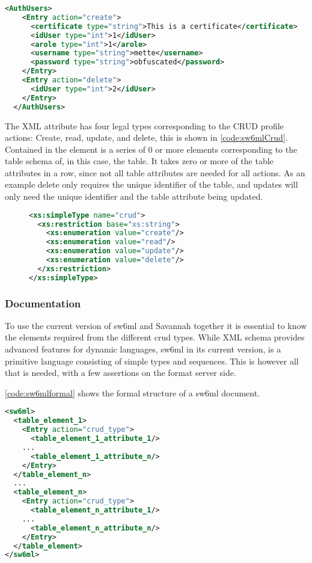 \begin{Code}
\begin{lstlisting}[label=code:sw6mlExample01,language=XML,caption=Example of sw6ml syntax]
 <AuthUsers>
    <Entry action="create">
      <certificate type="string">This is a certificate</certificate>
      <idUser type="int">1</idUser>
      <arole type="int">1</arole>
      <username type="string">mette</username>
      <password type="string">obfuscated</password>
    </Entry>
    <Entry action="delete">
      <idUser type="int">2</idUser>
    </Entry>
  </AuthUsers>
\end{lstlisting}
\end{Code}
The  XML attribute has four legal types corresponding to the CRUD profile actions: Create, read, update, and delete, this is shown in \autoref{code:sw6mlCrud}.
Contained in the   element is a series of 0 or more elements corresponding to the table schema of, in this case, the  table.
It takes zero or more of the table attributes in a row, since not all table attributes are needed for all actions. As an example delete only requires the unique identifier of the table, and
updates will only need the unique identifier and the table attribute being updated.
\begin{figure}[H]
\begin{lstlisting}[label=code:sw6mlCrud,language=XML,caption=sw6ml crud simple type]
 <xs:simpleType name="crud">
  <xs:restriction base="xs:string">
    <xs:enumeration value="create"/>
    <xs:enumeration value="read"/>
    <xs:enumeration value="update"/>
    <xs:enumeration value="delete"/>
  </xs:restriction>
</xs:simpleType>
\end{lstlisting}
\end{figure}

\subsubsection{Documentation}
\label{sw6mlusage}
To use the current version of sw6ml and Savannah together it is essential to know the elements required from the different crud types.
While XML schema provides advanced features for dynamic languages, sw6ml in its current version, is a primitive language consisting of simple types and sequences.
This is however all that is needed, with a few assertions on the format server side.

\autoref{code:sw6mlformal} shows the formal structure of a sw6ml document.
\begin{Code}
\begin{lstlisting}[label=code:sw6mlformal,language=XML,caption=Root and table elements]
<sw6ml> 
  <table_element_1>
    <Entry action="crud_type">
      <table_element_1_attribute_1/>
	...
      <table_element_1_attribute_n/>
    </Entry>
  </table_element_n>
  ...
  <table_element_n>
    <Entry action="crud_type">
      <table_element_n_attribute_1/>
	...
      <table_element_n_attribute_n/>
    </Entry>
  </table_element>
</sw6ml>
\end{lstlisting}
\end{Code}

